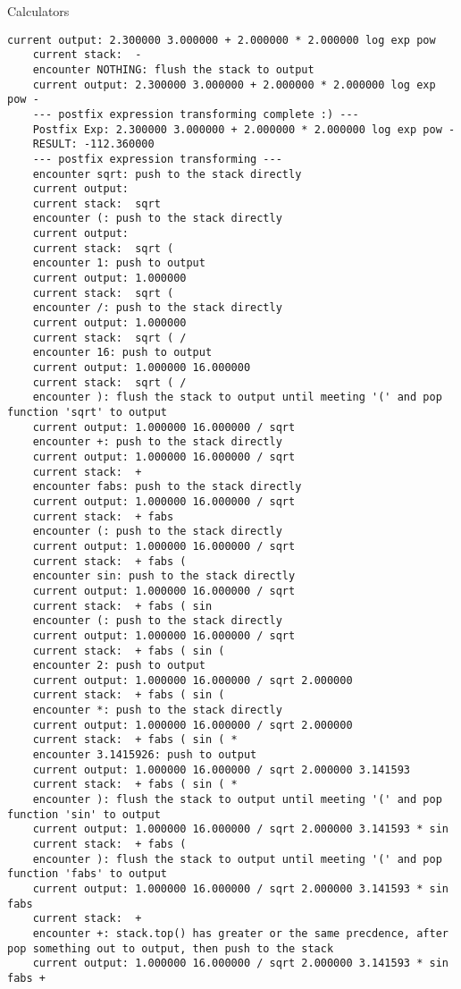 \begin{homeworkProblem}{Calculators}
\begin{lstlisting}[breaklines=true]
    current output: 2.300000 3.000000 + 2.000000 * 2.000000 log exp pow
    current stack:  -
    encounter NOTHING: flush the stack to output
    current output: 2.300000 3.000000 + 2.000000 * 2.000000 log exp pow -
    --- postfix expression transforming complete :) ---
    Postfix Exp: 2.300000 3.000000 + 2.000000 * 2.000000 log exp pow -
    RESULT: -112.360000
    --- postfix expression transforming ---
    encounter sqrt: push to the stack directly
    current output:
    current stack:  sqrt
    encounter (: push to the stack directly
    current output:
    current stack:  sqrt (
    encounter 1: push to output
    current output: 1.000000
    current stack:  sqrt (
    encounter /: push to the stack directly
    current output: 1.000000
    current stack:  sqrt ( /
    encounter 16: push to output
    current output: 1.000000 16.000000
    current stack:  sqrt ( /
    encounter ): flush the stack to output until meeting '(' and pop function 'sqrt' to output
    current output: 1.000000 16.000000 / sqrt
    encounter +: push to the stack directly
    current output: 1.000000 16.000000 / sqrt
    current stack:  +
    encounter fabs: push to the stack directly
    current output: 1.000000 16.000000 / sqrt
    current stack:  + fabs
    encounter (: push to the stack directly
    current output: 1.000000 16.000000 / sqrt
    current stack:  + fabs (
    encounter sin: push to the stack directly
    current output: 1.000000 16.000000 / sqrt
    current stack:  + fabs ( sin
    encounter (: push to the stack directly
    current output: 1.000000 16.000000 / sqrt
    current stack:  + fabs ( sin (
    encounter 2: push to output
    current output: 1.000000 16.000000 / sqrt 2.000000
    current stack:  + fabs ( sin (
    encounter *: push to the stack directly
    current output: 1.000000 16.000000 / sqrt 2.000000
    current stack:  + fabs ( sin ( *
    encounter 3.1415926: push to output
    current output: 1.000000 16.000000 / sqrt 2.000000 3.141593
    current stack:  + fabs ( sin ( *
    encounter ): flush the stack to output until meeting '(' and pop function 'sin' to output
    current output: 1.000000 16.000000 / sqrt 2.000000 3.141593 * sin
    current stack:  + fabs (
    encounter ): flush the stack to output until meeting '(' and pop function 'fabs' to output
    current output: 1.000000 16.000000 / sqrt 2.000000 3.141593 * sin fabs
    current stack:  +
    encounter +: stack.top() has greater or the same precdence, after pop something out to output, then push to the stack
    current output: 1.000000 16.000000 / sqrt 2.000000 3.141593 * sin fabs +

\end{lstlisting}
\end{homeworkProblem}
